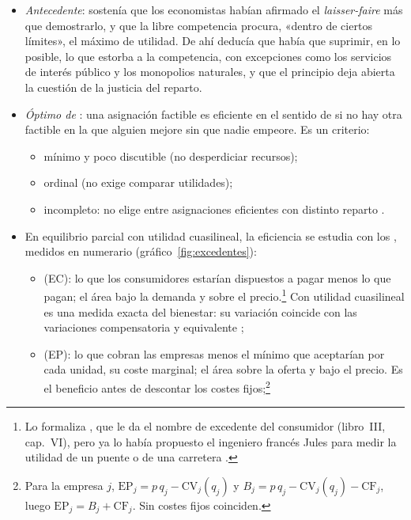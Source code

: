 \documentclass[11pt]{article}
\begin{document}
\begin{itemize}
\item \emph{Antecedente}: \textcite[lección~44]{Walras1874Elements} sostenía que los economistas habían afirmado el \emph{laisser-faire} más que demostrarlo, y que la libre competencia procura, «dentro de ciertos límites», el máximo de utilidad. De ahí deducía que había que suprimir, en lo posible, lo que estorba a la competencia, con excepciones como los servicios de interés público y los monopolios naturales, y que el principio deja abierta la cuestión de la justicia del reparto.
\item \emph{Óptimo de }: una asignación factible es eficiente en el sentido de \textcite{Pareto1906Manuale} si no hay otra factible en la que alguien mejore sin que nadie empeore. Es un criterio:
  \begin{itemize}
  \item mínimo y poco discutible (no desperdiciar recursos);
  \item ordinal (no exige comparar utilidades);
  \item incompleto: no elige entre asignaciones eficientes con distinto reparto .
  \end{itemize}
\item En equilibrio parcial con utilidad cuasilineal, la eficiencia se estudia con los , medidos en numerario (gráfico~\ref{fig:excedentes}):
  \begin{itemize}
  \item {} (EC): lo que los consumidores estarían dispuestos a pagar menos lo que pagan; el área bajo la demanda y sobre el precio.\footnote{Lo formaliza \textcite{Marshall1890Principles}, que le da el nombre de excedente del consumidor (libro~III, cap.~VI), pero ya lo había propuesto el ingeniero francés Jules \textcite{Dupuit1844Mesure} para medir la utilidad de un puente o de una carretera .} Con utilidad cuasilineal es una medida exacta del bienestar: su variación coincide con las variaciones compensatoria y equivalente ;
  \item {} (EP): lo que cobran las empresas menos el mínimo que aceptarían por cada unidad, su coste marginal; el área sobre la oferta y bajo el precio. Es el beneficio antes de descontar los costes fijos;\footnote{Para la empresa $j$, $\mathrm{EP}_j=p\,q_j-\mathrm{CV}_j(q_j)$ y $B_j=p\,q_j-\mathrm{CV}_j(q_j)-\mathrm{CF}_j$, luego $\mathrm{EP}_j=B_j+\mathrm{CF}_j$. Sin costes fijos coinciden.}

\end{itemize}
\end{itemize}
\end{document}
